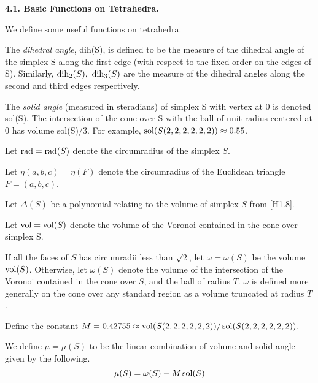 \bigskip

{\bf 4.1. Basic Functions on Tetrahedra.}

\bigskip

We define some useful functions on tetrahedra.

The {\it dihedral angle}, dih(S),  is defined to be the measure of the dihedral angle of the simplex S along the first edge (with respect to the fixed order on the edges of S).  Similarly, $\operatorname{dih}_2(S),\ \operatorname{dih}_3(S)$ are the measure of the dihedral angles along the second and third edges respectively.

The {\it solid angle} (measured in steradians) of simplex S with vertex at $0$ is denoted sol(S).  
The intersection of the cone over S with the ball of unit radius centered at $0$ has volume sol(S)/3.  For example, $\operatorname{sol}(S(2,2,2,2,2,2))\approx 0.55$.  

Let $\operatorname{rad}=\operatorname{rad}(S)$ denote the circumradius of the simplex $S$.  

Let $\eta(a,b,c)=\eta(F)$ denote the circumradius of the Euclidean triangle $F=(a,b,c)$.

Let $\Delta(S)$ be a polynomial relating to the volume of simplex $S$ from [H1.8].

Let $\operatorname{vol}=\operatorname{vol}(S)$ denote the volume of the Voronoi contained in the cone over simplex S.

If all the faces of $S$ has circumradii less than $\sqrt2$,
let $\omega=\omega(S)$ be the volume $\operatorname{vol}(S)$.
Otherwise, let $\omega(S)$ denote the volume of the intersection of the 
Voronoi contained in the cone over $S$, and the ball of radius $T$.  $\omega$ is defined more generally on the cone over any standard region as a
volume truncated at radius $T$.


Define the constant $M=0.42755 \approx \operatorname{vol}(S(2,2,2,2,2,2))/\operatorname{sol}(S(2,2,2,2,2,2)).$  

We define $\mu=\mu(S)$ to be the linear combination of volume 
and solid angle given by the following.
$$\mu(S)=\omega(S)-M \operatorname{sol}(S)$$


